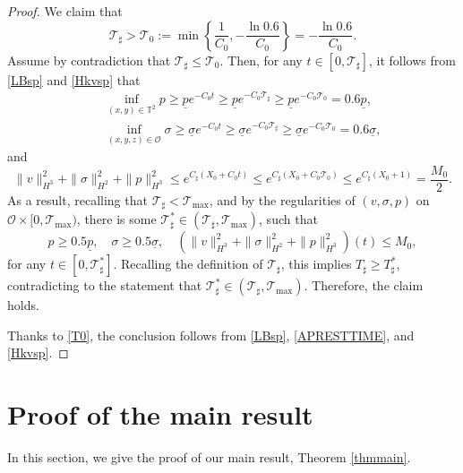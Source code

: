 \documentclass[12pt,reqno]{amsart}
\numberwithin{equation}{section}
\begin{document}
\begin{proof}
We claim that
\begin{equation}\label{T0}
\mathcal T_\sharp>\mathcal T_0:=\min\left\{\frac{1}{C_0},-\frac{\ln 0.6}{C_0}\right\}=-\frac{\ln 0.6}{C_0}.
\end{equation}
Assume by contradiction that $\mathcal T_\sharp\leq\mathcal T_0$. Then, for any $t\in[0,\mathcal T_\sharp]$, it follows from \eqref{LBsp} and \eqref{Hkvsp} that
\begin{eqnarray*}
  &&\inf_{(x,y)\in\mathbb T^2}p\geq \underline pe^{-C_0t}\geq \underline pe^{-C_0\mathcal T_\sharp}\geq \underline pe^{-C_0\mathcal T_0}= 0.6\underline p,\\
  &&\inf_{(x,y,z)\in\mathcal O}\sigma\geq \underline \sigma e^{-C_0t}\geq \underline \sigma
  e^{-C_0\mathcal T_\sharp}\geq \underline \sigma e^{-C_0\mathcal T_0}= 0.6\underline\sigma,
\end{eqnarray*}
and
$$
  \|v\|_{H^3}^2 +\|\sigma\|_{H^2}^2+\|p\|_{H^3}^2\leq e^{C_\sharp(X_0+C_0t)}
  \leq e^{C_\sharp(X_0+C_0\mathcal T_0)}\leq e^{C_\sharp(X_0+1)}=\frac{M_0}{2}.
$$
As a result, recalling that $\mathcal T_\sharp<\mathcal T_\text{max}$, and by the regularities of $(v,\sigma,p)$ on $\mathcal O\times[0,\mathcal T_\text{max})$,
there is some $\mathcal T_\sharp^*\in(\mathcal T_\sharp,\mathcal T_\text{max})$, such that
$$
  p\geq 0.5\underline p,\quad \sigma\geq0.5\underline\sigma,\quad
  (\|v\|_{H^3}^2 +\|\sigma\|_{H^2}^2+\|p\|_{H^3}^2)(t)\leq M_0,
$$
for any $t\in[0,\mathcal T_\sharp^*]$. Recalling the definition of $\mathcal T_\sharp$, this implies
$T_\sharp\geq T_\sharp^*$, contradicting to the statement that $\mathcal T_\sharp^*\in(\mathcal T_\sharp,\mathcal T_\text{max})$.
Therefore, the claim holds.

Thanks to \eqref{T0}, the conclusion follows from \eqref{LBsp}, \eqref{APRESTTIME}, and \eqref{Hkvsp}.
\end{proof}

\section{Proof of the main result}
\label{sec4}

In this section, we give the proof of our main result, Theorem \ref{thmmain}.
\end{document}
